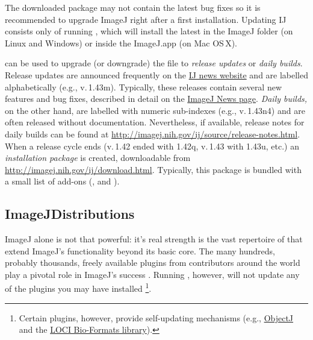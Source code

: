 The downloaded package may not contain the latest bug fixes so it
is recommended to upgrade ImageJ right after a first installation.
Updating IJ consists only
of running \textsf{},
which will install the latest 
in the ImageJ folder (on Linux and Windows) or inside the ImageJ.app
(on Mac OS\,X). 

\textsf{}
can be used to upgrade (or downgrade) the  file
to \emph{release updates} or \emph{daily builds}. Release updates
are announced frequently on the \href{http://imagej.nih.gov/ij/notes.html}{IJ news website}
and are labelled alphabetically (e.g., v.\,1.43m). Typically, these
releases contain several new features and bug fixes, described in
detail on the \href{http://imagej.nih.gov/ij/notes.html}{ImageJ News page}.
\emph{Daily builds,} on the other hand, are labelled with numeric
sub-indexes (e.g., v.\,1.43n4) and are often released without documentation.
Nevertheless, if available, release notes for daily builds can be
found at \url{http://imagej.nih.gov/ij/source/release-notes.html}.
When a release cycle ends (v.\,1.42 ended with 1.42q, v.\,1.43 with
1.43u, etc.) an \emph{installation package }is created, downloadable
from \url{http://imagej.nih.gov/ij/download.html}. Typically, this
package is bundled with a small list of add-ons (,
 and ).




\subsection{ImageJDistributions\label{sec:ImageJ-Distributions}}

ImageJ alone is not that powerful: it's real strength is the vast
repertoire of  that extend ImageJ's functionality
beyond its basic core. The many hundreds, probably thousands,  freely
available plugins from contributors around the world play a pivotal
role in ImageJ's success \cite{Collins:2007p13684}. Running \textsf{},
however, will not update any of the plugins you may have installed%
\footnote{Certain plugins, however, provide self-updating mechanisms (e.g.,
\href{http://simon.bio.uva.nl/objectj/}{ObjectJ} and the \href{http://www.loci.wisc.edu/ome/formats.html}{LOCI Bio-Formats library}).%
}.

